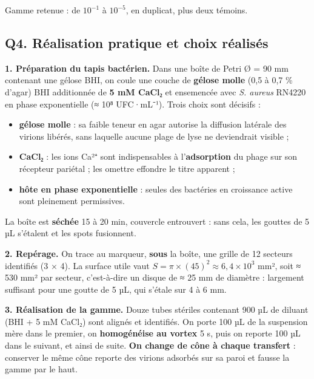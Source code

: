 \documentclass[11pt,a4paper]{article}
\providecommand{\tightlist}{\setlength{\itemsep}{0pt}\setlength{\parskip}{0pt}}
\begin{document}
Gamme retenue : de \(10^{-1}\) à \(10^{-5}\), en duplicat, plus deux témoins.

\hypertarget{q4.-ruxe9alisation-pratique-et-choix-ruxe9alisuxe9s}{%
\subsection{Q4. Réalisation pratique et choix réalisés}\label{q4.-ruxe9alisation-pratique-et-choix-ruxe9alisuxe9s}}

\textbf{1. Préparation du tapis bactérien.} Dans une boîte de Petri Ø = 90 mm contenant une gélose BHI, on coule une couche de \textbf{gélose molle} (0,5 à 0,7 \% d'agar) BHI additionnée de \textbf{5 mM CaCl₂} et ensemencée avec \emph{S. aureus} RN4220 en phase exponentielle (≈ 10⁸ UFC·mL⁻¹). Trois choix sont décisifs :

\begin{itemize}
\tightlist
\item
  \textbf{gélose molle} : sa faible teneur en agar autorise la diffusion latérale des virions libérés, sans laquelle aucune plage de lyse ne deviendrait visible ;
\item
  \textbf{CaCl₂} : les ions Ca²⁺ sont indispensables à l'\textbf{adsorption} du phage sur son récepteur pariétal ; les omettre effondre le titre apparent ;
\item
  \textbf{hôte en phase exponentielle} : seules des bactéries en croissance active sont pleinement permissives.
\end{itemize}

La boîte est \textbf{séchée} 15 à 20 min, couvercle entrouvert : sans cela, les gouttes de 5 µL s'étalent et les spots fusionnent.

\textbf{2. Repérage.} On trace au marqueur, \textbf{sous} la boîte, une grille de 12 secteurs identifiés (3 × 4). La surface utile vaut \(S = \pi\times(45)^2 \approx 6{,}4\times10^{3}\) mm², soit ≈ 530 mm² par secteur, c'est-à-dire un disque de ≈ 25 mm de diamètre : largement suffisant pour une goutte de 5 µL, qui s'étale sur 4 à 6 mm.

\textbf{3. Réalisation de la gamme.} Douze tubes stériles contenant 900 µL de diluant (BHI + 5 mM CaCl₂) sont alignés et identifiés. On porte 100 µL de la suspension mère dans le premier, on \textbf{homogénéise au vortex} 5 s, puis on reporte 100 µL dans le suivant, et ainsi de suite. \textbf{On change de cône à chaque transfert} : conserver le même cône reporte des virions adsorbés sur sa paroi et fausse la gamme par le haut.
\end{document}
